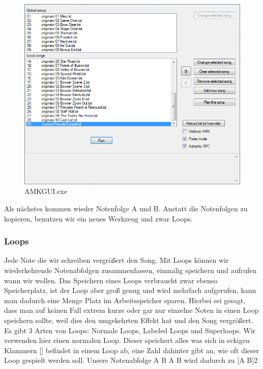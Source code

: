 \begin{figure}[htbp] \centering
	\includegraphics[width=.95\linewidth]{images/AMKGUI.png}
	\caption{AMKGUI.exe}
	\label{AMKGUI}
\end{figure}


Als nächstes kommen wieder Notenfolge A und B. Anstatt die Notenfolgen zu kopieren, benutzen wir ein neues Werkzeug und zwar Loops.

\subsubsection{Loops}
Jede Note die wir schreiben vergrößert den Song. Mit Loops können wir wiederkehrende Notenabfolgen zusammenfassen, einmalig speichern und aufrufen wann wir wollen.
Das Speichern eines Loops verbraucht zwar ebenso Speicherplatz, ist der Loop aber groß genug und wird mehrfach aufgerufen, kann man dadurch eine Menge Platz im Arbeitsspeicher sparen.
Hierbei sei gesagt, dass man auf keinen Fall extrem kurze oder gar nur einzelne Noten in einen Loop speichern sollte, weil dies den umgekehrten Effekt hat und den Song vergrößert. \\
Es gibt 3 Arten von Loops: Normale Loops, Labeled Loops und Superloops. Wir verwenden hier einen normalen Loop. Dieser speichert alles was sich in eckigen Klammern [] befindet in einem Loop ab, eine Zahl dahinter gibt an, wie oft dieser Loop gespielt werden soll. Unsere Notenabfolge A B A B wird dadurch zu [A B]2




